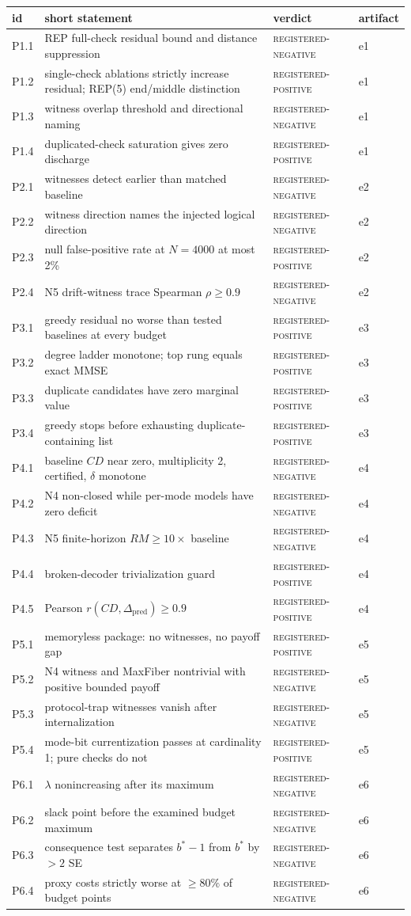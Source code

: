 \documentclass[11pt]{article}
\newcommand{\grade}[1]{\textsc{#1}}
\newcommand{\gRegPos}{\grade{registered-positive}}
\newcommand{\gRegNeg}{\grade{registered-negative}}
\theoremstyle{definition}
\begin{document}
\begin{table}[htbp]
\centering\footnotesize
\begin{tabular}{l p{9.2cm} l l}
\toprule
id & short statement & verdict & artifact \\
\midrule
P1.1 & REP full-check residual bound and distance suppression & \gRegNeg & e1 \\ P1.2 & single-check ablations strictly increase residual; REP(5) end/middle distinction & \gRegPos & e1 \\ P1.3 & witness overlap threshold and directional naming & \gRegNeg & e1 \\ P1.4 & duplicated-check saturation gives zero discharge & \gRegPos & e1 \\ P2.1 & witnesses detect earlier than matched baseline & \gRegNeg & e2 \\ P2.2 & witness direction names the injected logical direction & \gRegNeg & e2 \\ P2.3 & null false-positive rate at $N{=}4000$ at most 2\% & \gRegPos & e2 \\ P2.4 & N5 drift-witness trace Spearman $\rho \ge 0.9$ & \gRegNeg & e2 \\ P3.1 & greedy residual no worse than tested baselines at every budget & \gRegPos & e3 \\ P3.2 & degree ladder monotone; top rung equals exact MMSE & \gRegPos & e3 \\ P3.3 & duplicate candidates have zero marginal value & \gRegPos & e3 \\ P3.4 & greedy stops before exhausting duplicate-containing list & \gRegPos & e3 \\ P4.1 & baseline $CD$ near zero, multiplicity 2, certified, $\delta$ monotone & \gRegNeg & e4 \\ P4.2 & N4 non-closed while per-mode models have zero deficit & \gRegNeg & e4 \\ P4.3 & N5 finite-horizon $RM \ge 10\times$ baseline & \gRegNeg & e4 \\ P4.4 & broken-decoder trivialization guard & \gRegPos & e4 \\ P4.5 & Pearson $r(CD, \Delta_{\mathrm{pred}}) \ge 0.9$ & \gRegPos & e4 \\ P5.1 & memoryless package: no witnesses, no payoff gap & \gRegPos & e5 \\ P5.2 & N4 witness and MaxFiber nontrivial with positive bounded payoff & \gRegNeg & e5 \\ P5.3 & protocol-trap witnesses vanish after internalization & \gRegNeg & e5 \\ P5.4 & mode-bit currentization passes at cardinality 1; pure checks do not & \gRegPos & e5 \\ P6.1 & $\lambda$ nonincreasing after its maximum & \gRegNeg & e6 \\ P6.2 & slack point before the examined budget maximum & \gRegNeg & e6 \\ P6.3 & consequence test separates $b^{*}{-}1$ from $b^{*}$ by $> 2$ SE & \gRegNeg & e6 \\ P6.4 & proxy costs strictly worse at $\ge 80\%$ of budget points & \gRegNeg & e6 \\ \midrule

\end{tabular}
\end{table}
\end{document}
